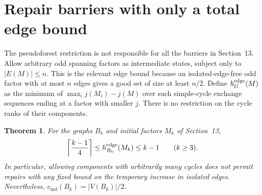 \documentclass[11pt]{article}
\newtheorem{theorem}{Theorem}[section]
\newcommand{\cind}{c_{\mathrm{ind}}}
\begin{document}
\section{Repair barriers with only a total edge bound}
The pseudoforest restriction is not responsible for all the barriers in
Section~13. Allow arbitrary odd spanning factors as intermediate states,
subject only to $|E(M)|\leq n$. This is the relevant edge bound because
an isolated-edge-free odd factor with at most $n$ edges gives a good set
of size at least $n/2$. Define $h^{\rm edge}_G(M)$ as the minimum of
$\max_i j(M_i)-j(M)$ over such simple-cycle exchange sequences ending
at a factor with smaller $j$. There is no restriction on the cycle
ranks of their components.

\begin{theorem}\label{thm:edge-budget-barrier}
For the graphs $B_k$ and initial factors $M_k$ of Section~13,
\[
 \left\lceil\frac{k-1}{4}\right\rceil
 \leq h^{\rm edge}_{B_k}(M_k)\leq k-1 \qquad(k\geq3).
\]
In particular, allowing components with arbitrarily many cycles does
not permit repairs with any fixed bound on the temporary increase in
isolated edges. Nevertheless, $\cind(B_k)=|V(B_k)|/2$.
\end{theorem}
\end{document}
